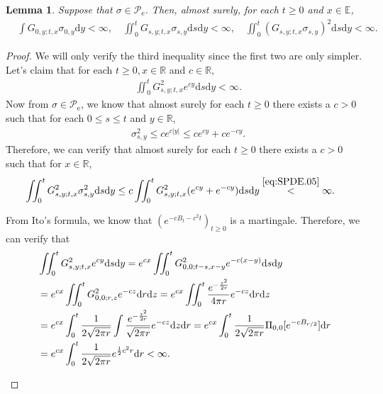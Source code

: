\documentclass[12pt,a4paper]{amsart}
\numberwithin{equation}{section}
\theoremstyle{plain}
\newtheorem{lemma}[theorem]{Lemma}
\theoremstyle{remark}
\newenvironment{proof*}[1][\proofname]{
	\renewcommand\qedsymbol{\rule{3mm}{3mm}}
	\begin{proof}[#1]}{\end{proof}}
\begin{document}
\begin{lemma} \label{thm:SC.4}
	Suppose that $\sigma \in \mathscr P_\mathrm e$.
	Then, almost surely, for each $t\geq 0$ and $x\in \mathbb E$,
\begin{align} 
&\int G_{0,y;t,x}\sigma_{0,y}\mathrm dy< \infty, \quad \iint_0^t G_{s,y;t,x} \sigma_{s,y}\mathrm ds\mathrm dy < \infty, \quad \iint_0^t  (G_{s,y;t,x}\sigma_{s,y})^2 \mathrm ds \mathrm dy < \infty.
\end{align}
\end{lemma}
\begin{proof}
	We will only verify the third inequality since the first two are only simpler.
	Let's claim that for each $t\geq 0, x\in \mathbb R$ and $c\in \mathbb R$,
\begin{align} \label{eq:SPDE.05}
	& \iint_0^t G_{s,y;t,x}^2 e^{cy}\mathrm ds\mathrm dy < \infty.
\end{align}
	Now from $\sigma \in \mathscr P_\mathrm e$, we know that almost surely for each $t\geq 0$ there exists a $c>0$ such that for each $0\leq s\leq t$ and $y\in \mathbb R$,
\begin{align} 
&  \sigma_{s,y}^2 
\leq  ce^{c|y|} 
\leq ce^{cy} + ce^{-cy}.
\end{align}
Therefore, we can verify that almost surely for each $t\geq 0$ there exists a $c>0$ such that for $x\in \mathbb R$,
\begin{align} 
& \iint_0^t G_{s,y;t,x}^2 \sigma_{s,y}^2  \mathrm ds\mathrm dy 
\leq  c\iint_0^t G_{s,y;t,x}^2 (e^{cy}+e^{-cy}) \mathrm ds\mathrm dy 
\overset{\eqref{eq:SPDE.05}}< \infty.
\end{align}
\begin{proof*}
From Ito's formula, we know that $(e^{-cB_t -c^2t })_{t\geq 0}$ is a martingale.
Therefore, we can verify that 
\begin{align} 
&  \iint_0^t  G_{s,y;t,x}^2  e^{cy}\mathrm ds \mathrm dy = e^{cx} \iint_0^t G^2_{0, 0; t-s, x-y} e^{-c(x-y)} \mathrm ds\mathrm dy
\\ & = e^{cx} \iint_0^t G^2_{0, 0; r, z} e^{-cz} \mathrm dr\mathrm dz
= e^{cx}\iint_0^t \frac{e^{-\frac{z^2}{2r}}}{4\pi r} e^{-cz}\mathrm dr\mathrm dz
\\& = e^{cx} \int_0^t \frac{1}{2\sqrt{2\pi r}} \int \frac{e^{-\frac{z^2}{2r}}}{\sqrt{2\pi r}} e^{-cz} \mathrm dz\mathrm dr
= e^{cx} \int_0^t \frac{1}{2\sqrt{2\pi r}} \Pi_{0,0}[e^{-cB_{r/2}}] \mathrm d r
\\& =  e^{cx} \int_0^t \frac{1}{2\sqrt{2\pi r}} e^{\frac{1}{2}c^2 r} \mathrm d r < \infty.
\qedhere
\end{align}
\end{proof*}
\end{proof}
\end{document}
